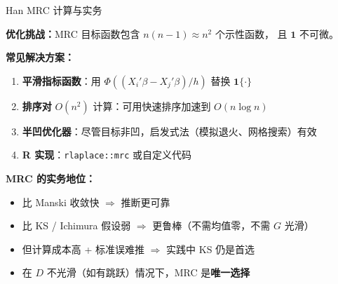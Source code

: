 \documentclass[aspectratio=169, 10pt]{beamer}
\begin{document}
\begin{frame}{Han MRC 计算与实务}

  \textbf{优化挑战：}MRC 目标函数包含 $n(n-1) \approx n^2$ 个示性函数，
  且 $\mathbf{1}$ 不可微。

  \begin{highlightbox}
    \textbf{常见解决方案：}
    \begin{enumerate}\setlength{\itemsep}{1pt}
      \item \textbf{平滑指标函数}：用 $\Phi((X_i'\beta - X_j'\beta)/h)$ 替换 $\mathbf{1}\{\cdot\}$
      \item \textbf{排序对} $O(n^2)$ 计算：可用快速排序加速到 $O(n \log n)$
      \item \textbf{半凹优化器}：尽管目标非凹，启发式法（模拟退火、网格搜索）有效
      \item \textbf{R 实现}：\texttt{rlaplace::mrc} 或自定义代码
    \end{enumerate}
  \end{highlightbox}

  \begin{keybox}
    \textbf{MRC 的实务地位：}
    \begin{itemize}\setlength{\itemsep}{1pt}
      \item 比 Manski 收敛快 $\Rightarrow$ 推断更可靠
      \item 比 KS / Ichimura 假设弱 $\Rightarrow$ 更鲁棒（不需均值零，不需 $G$ 光滑）
      \item 但计算成本高 + 标准误难推 $\Rightarrow$ 实践中 KS 仍是首选
      \item 在 $D$ 不光滑（如有跳跃）情况下，MRC 是\textbf{唯一选择}
    \end{itemize}
  \end{keybox}

\end{frame}
\end{document}

